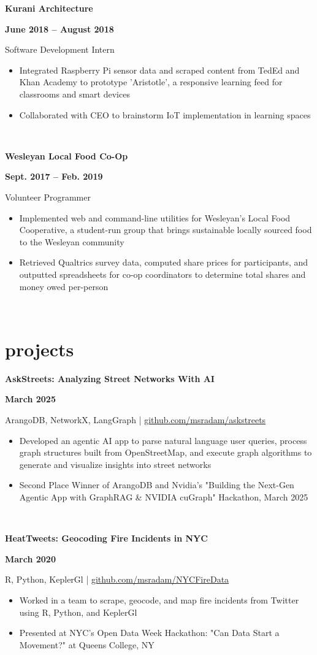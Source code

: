 \documentclass[letterpaper, 11pt]{article}
\newcommand{\expentry}[5]{

    \begin{minipage}[b]{0.5\textwidth}
        \raggedright
        \bf\large #3
        \end{minipage}%
        \begin{minipage}[b]{0.5\textwidth}
        \raggedleft
        \bf {#1} -- {#2}
        \end{minipage}

    \begin{minipage}[t]{\linewidth}
    \vspace{-3mm}
    #4
    \vspace{-1.75mm}
    \small{#5}
    \end{minipage}\\
    \vspace{1mm}
    }
\newcommand{\projectentry}[4]{

    \begin{minipage}[b]{0.5\textwidth}
        \raggedright
        \bf #2
        \end{minipage}%
        \begin{minipage}[b]{0.5\textwidth}
        \raggedleft
        \bf #1
        \end{minipage}

    \begin{minipage}[t]{\linewidth}
    \vspace{-3mm}
    \small #3
    \vspace{-1.75mm}
    \small{#4}
    \end{minipage}\\
    \vspace{1mm}
    }
\begin{document}
    \expentry{June 2018}
    {August 2018}
    {Kurani Architecture}
    {Software Development Intern}
    {\begin{itemize}
          \setlength\itemsep{-0.5mm}
          \item Integrated Raspberry Pi sensor data and scraped content from TedEd and Khan Academy to prototype 'Aristotle', a responsive learning feed for classrooms and smart devices
          \item Collaborated with CEO to brainstorm IoT implementation in learning spaces 
        \end{itemize}
    }

    \expentry{Sept. 2017}
    {Feb. 2019}
    {Wesleyan Local Food Co-Op}
    {Volunteer Programmer}
    {\begin{itemize}
          \setlength\itemsep{0.1mm}
          \item Implemented web and command-line utilities for Wesleyan's Local Food Cooperative, a student-run group that brings sustainable locally sourced food to the Wesleyan community
          \item Retrieved Qualtrics survey data, computed share prices for participants, and outputted spreadsheets for co-op coordinators to determine total shares and money owed per-person
        \end{itemize}
    }



    \section{projects}
        \projectentry{March 2025}
        {AskStreets: Analyzing Street Networks With AI}
        {ArangoDB, NetworkX, LangGraph | \href{https://github.com/msradam/askstreets}{github.com/msradam/askstreets}}
        {\begin{itemize}
            \setlength\itemsep{-0.5mm}
            \item Developed an agentic AI app to parse natural language user queries, process graph structures built from OpenStreetMap, and execute graph algorithms to generate and visualize insights into street networks
            \item Second Place Winner of ArangoDB and Nvidia's "Building the Next-Gen Agentic App with GraphRAG \& NVIDIA cuGraph" Hackathon, March 2025

        \end{itemize}
        } 

        \projectentry{March 2020}
        {HeatTweets: Geocoding Fire Incidents in NYC}
        {R, Python, KeplerGl | \href{https://github.com/msradam/NYCFireData}{github.com/msradam/NYCFireData}}
        {\begin{itemize}
            \setlength\itemsep{-0.5mm}
            \item Worked in a team to scrape, geocode, and map fire incidents from Twitter using R, Python, and KeplerGl
            \item Presented at NYC's Open Data Week Hackathon: "Can Data Start a Movement?" at Queens College, NY
        \end{itemize}
        }
\end{document}
